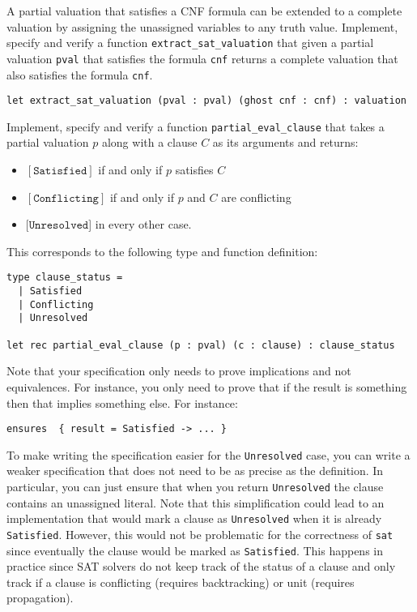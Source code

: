 \documentclass[11pt]{article}
\begin{document}
\begin{task}[10 pts]
A partial valuation that satisfies a CNF formula can be extended to a complete valuation by assigning the unassigned variables to any truth value. Implement, specify and verify a function \verb|extract_sat_valuation| that given a partial valuation \texttt{pval} that satisfies the formula \texttt{cnf} returns a complete valuation that also satisfies the formula \texttt{cnf}.

\begin{lstlisting}
let extract_sat_valuation (pval : pval) (ghost cnf : cnf) : valuation
\end{lstlisting}
\end{task}

\begin{task}[10 pts] Implement, specify and verify a function \verb|partial_eval_clause| 
that takes a partial valuation $p$ along with a clause $C$ as
its arguments and returns:
\begin{itemize}
\setlength\itemsep{0em}
\item $[\texttt{Satisfied}]$ if and only if $p$ satisfies $C$
\item $[\texttt{Conflicting}]$ if and only if $p$ and $C$ are conflicting
\item $[\texttt{Unresolved}$] in every other case. 
\end{itemize}

This corresponds to the following type and function definition:
\begin{lstlisting}
type clause_status =
  | Satisfied
  | Conflicting
  | Unresolved

let rec partial_eval_clause (p : pval) (c : clause) : clause_status
\end{lstlisting}

Note that your specification only needs to prove implications and not equivalences. For instance, you only need to prove that if the result is something then 
that implies something else. For instance:

\begin{lstlisting}
ensures  { result = Satisfied -> ... }
\end{lstlisting}

To make writing the specification easier for the \texttt{Unresolved} case, you can write a weaker specification that does not need to be as precise as the definition. In particular, you can just ensure that when you return \texttt{Unresolved} the clause contains an unassigned literal. Note that this simplification could lead to an implementation that would mark a clause as \texttt{Unresolved} when it is already \texttt{Satisfied}. However, this would not be problematic for the correctness of \texttt{sat} since eventually the clause would be marked as \texttt{Satisfied}. This happens in practice since SAT solvers do not keep track of the status of a clause and only track if a clause is conflicting (requires backtracking) or unit (requires propagation).
\end{task}
\end{document}
